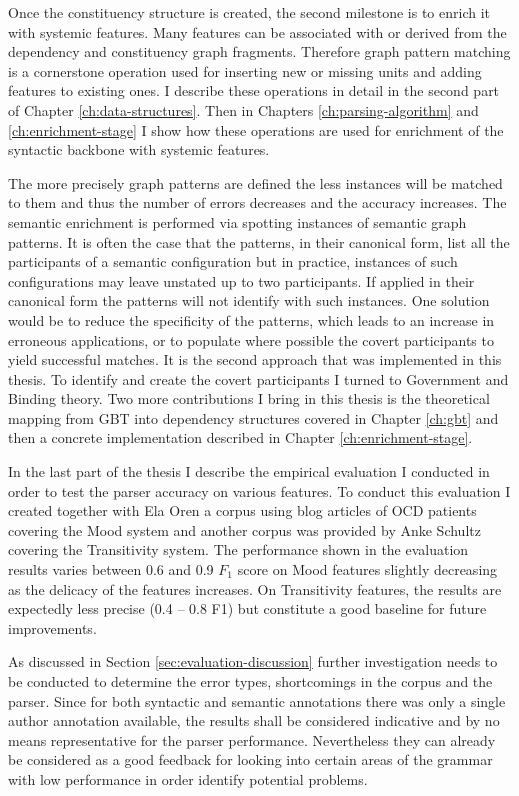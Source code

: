     Once the constituency structure is created, the second milestone is to enrich it with systemic features. Many features can be associated with or derived from the dependency and constituency graph fragments. Therefore graph pattern matching is a cornerstone operation used for inserting new or missing units and adding features to existing ones. I describe these operations in detail in the second part of Chapter \ref{ch:data-structures}. Then in Chapters \ref{ch:parsing-algorithm} and \ref{ch:enrichment-stage} I show how these operations are used for enrichment of the syntactic backbone with systemic features.

    The more precisely graph patterns are defined the less instances will be matched to them and thus the number of errors decreases and the accuracy increases. The semantic enrichment is performed via spotting instances of semantic graph patterns. It is often the case that the patterns, in their canonical form, list all the participants of a semantic configuration but in practice, instances of such configurations may leave unstated up to two participants. If applied in their canonical form the patterns will not identify with such instances. One solution would be to reduce the specificity of the patterns, which leads to an increase in erroneous applications, or to populate where possible the covert participants to yield successful matches. It is the second approach that was implemented in this thesis. To identify and create the covert participants I turned to Government and Binding theory. Two more contributions I bring in this thesis is the theoretical mapping from GBT into dependency structures covered in Chapter \ref{ch:gbt} and then a concrete implementation described in Chapter \ref{ch:enrichment-stage}.

In the last part of the thesis I describe the empirical evaluation I conducted in order to test the parser accuracy on various features. To conduct this evaluation I created together with Ela Oren a corpus using blog articles of OCD patients covering the Mood system and another corpus was provided by Anke Schultz covering the Transitivity system. The performance shown in the evaluation results varies between 0.6 and 0.9 $F_{1}$ score on Mood features slightly decreasing as the delicacy of the features increases. On Transitivity features, the results are expectedly less precise (0.4 -- 0.8 F1) but constitute a good baseline for future improvements. 

    As discussed in Section \ref{sec:evaluation-discussion} further investigation needs to be conducted to determine the error types, shortcomings in the corpus and the parser. Since for both syntactic and semantic annotations there was only a single author annotation available, the results shall be considered indicative and by no means representative for the parser performance. Nevertheless they can already be considered as a good feedback for looking into certain areas of the grammar with low performance in order identify potential problems.

